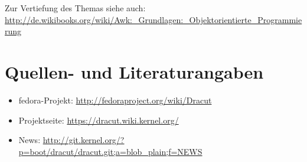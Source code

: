 \documentclass[10pt,a4paper]{article}
\begin{document}
\bigskip 
Zur Vertiefung des Themas siehe auch: \url{http://de.wikibooks.org/wiki/Awk:_Grundlagen:_Objektorientierte_Programmierung}


\section{Quellen- und Literaturangaben}
\label{sec:quell}

\begin{itemize}
 \item fedora-Projekt: \url{http://fedoraproject.org/wiki/Dracut}
 \item Projektseite: \url{https://dracut.wiki.kernel.org/}
 \item News: \url{http://git.kernel.org/?p=boot/dracut/dracut.git;a=blob_plain;f=NEWS}
\end{itemize}
\end{document}
